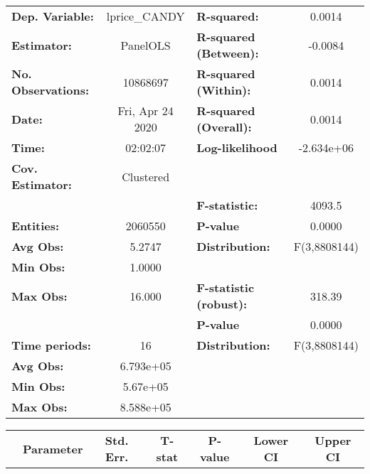 \documentclass{report}
\begin{document}
\begin{center}
\begin{tabular}{lclc}
\toprule
\textbf{Dep. Variable:}    &   lprice\_CANDY    & \textbf{  R-squared:         }   &      0.0014      \\
\textbf{Estimator:}        &      PanelOLS      & \textbf{  R-squared (Between):}  &     -0.0084      \\
\textbf{No. Observations:} &      10868697      & \textbf{  R-squared (Within):}   &      0.0014      \\
\textbf{Date:}             &  Fri, Apr 24 2020  & \textbf{  R-squared (Overall):}  &      0.0014      \\
\textbf{Time:}             &      02:02:07      & \textbf{  Log-likelihood     }   &    -2.634e+06    \\
\textbf{Cov. Estimator:}   &     Clustered      & \textbf{                     }   &                  \\
\textbf{}                  &                    & \textbf{  F-statistic:       }   &      4093.5      \\
\textbf{Entities:}         &      2060550       & \textbf{  P-value            }   &      0.0000      \\
\textbf{Avg Obs:}          &       5.2747       & \textbf{  Distribution:      }   &   F(3,8808144)   \\
\textbf{Min Obs:}          &       1.0000       & \textbf{                     }   &                  \\
\textbf{Max Obs:}          &       16.000       & \textbf{  F-statistic (robust):} &      318.39      \\
\textbf{}                  &                    & \textbf{  P-value            }   &      0.0000      \\
\textbf{Time periods:}     &         16         & \textbf{  Distribution:      }   &   F(3,8808144)   \\
\textbf{Avg Obs:}          &     6.793e+05      & \textbf{                     }   &                  \\
\textbf{Min Obs:}          &      5.67e+05      & \textbf{                     }   &                  \\
\textbf{Max Obs:}          &     8.588e+05      & \textbf{                     }   &                  \\
\bottomrule
\end{tabular}
\begin{tabular}{lcccccc}
                           & \textbf{Parameter} & \textbf{Std. Err.} & \textbf{T-stat} & \textbf{P-value} & \textbf{Lower CI} & \textbf{Upper CI}  \\

\end{tabular}
\end{center}
\end{document}
